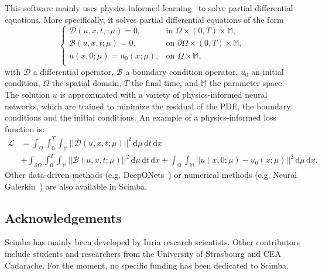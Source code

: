 
This software mainly uses physics-informed
learning~\cite{KarKevLuPerWanYan2021}
to solve partial differential equations.
More specifically, it solves partial differential equations of the form
\begin{equation*}
    \begin{cases}
        \mathcal{D}(u, x, t,; \mu) = 0,
         & \text{in } \Omega \times (0,T) \times \mathbb{M},          \\
        \mathcal{B}(u, x, t; \mu) = 0,
         & \text{on } \partial \Omega \times (0,T) \times \mathbb{M}, \\
        u(x, 0; \mu) = u_0(x; \mu),
         & \text{on } \Omega \times \mathbb{M},                       \\
    \end{cases}
\end{equation*}
with $\mathcal{D}$ a differential operator, $\mathcal{B}$ a boundary condition operator,
$u_0$ an initial condition, $\Omega$ the spatial domain,
$T$ the final time, and $\mathbb{M}$ the parameter space.
The solution $u$ is approximated with a variety of physics-informed neural networks,
which are trained to minimize the residual of the PDE,
the boundary conditions and the initial conditions.
An example of a physics-informed loss function is:
\begin{equation*}
    \begin{aligned}
        \mathcal{L} & =
        \int_\Omega \int_0^T \int_{\mathbb{M}}
        ||\mathcal{D}(u, x, t; \mu)||^2 \,
        \mathrm{d}\mu \, \mathrm{d}t \, \mathrm{d}x \\
                    & +
        \int_{\partial\Omega} \int_0^T \int_{\mathbb{M}}
        ||\mathcal{B}(u, x, t; \mu)||^2 \,
        \mathrm{d}\mu \, \mathrm{d}t \, \mathrm{d}x
        +
        \int_{\Omega} \int_{\mathbb{M}}
        ||u(x, 0; \mu) - u_0(x;\mu)||^2 \,
        \mathrm{d}\mu \, \mathrm{d}x.
    \end{aligned}
\end{equation*}
Other data-driven methods
(e.g. DeepONets~\cite{LuJinPanZhoKar2021})
or numerical methods
(e.g. Neural Galerkin~\cite{BruPehVan2024})
are also available in Scimba.




\subsection{Acknowledgements}
\label{sec::Scimba:acknowledgements}

Scimba has mainly been developed by Inria research scientists.
Other contributors include students and researchers
from the University of Strasbourg and CEA Cadarache.
For the moment, no specific funding has been dedicated to Scimba.


